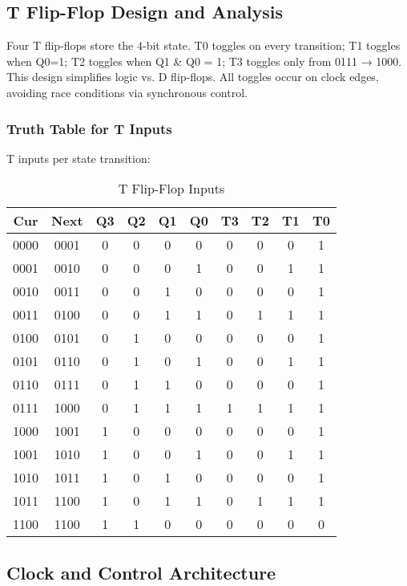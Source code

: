 \documentclass[10pt,a4paper]{article}
\begin{document}
\subsection*{T Flip-Flop Design and Analysis}

Four T flip-flops store the 4-bit state. T0 toggles on every transition; T1 toggles when Q0=1; T2 toggles when Q1 \& Q0 = 1; T3 toggles only from 0111 → 1000. This design simplifies logic vs. D flip-flops. All toggles occur on clock edges, avoiding race conditions via synchronous control.

\subsubsection*{Truth Table for T Inputs}

T inputs per state transition:

\begin{table}[H]
\centering
\begin{tabular}{|c|c|c|c|c|c|c|c|c|c|}
\hline
\textbf{Cur} & \textbf{Next} & Q3 & Q2 & Q1 & Q0 & T3 & T2 & T1 & T0 \\
\hline
0000 & 0001 & 0 & 0 & 0 & 0 & 0 & 0 & 0 & 1 \\
0001 & 0010 & 0 & 0 & 0 & 1 & 0 & 0 & 1 & 1 \\
0010 & 0011 & 0 & 0 & 1 & 0 & 0 & 0 & 0 & 1 \\
0011 & 0100 & 0 & 0 & 1 & 1 & 0 & 1 & 1 & 1 \\
0100 & 0101 & 0 & 1 & 0 & 0 & 0 & 0 & 0 & 1 \\
0101 & 0110 & 0 & 1 & 0 & 1 & 0 & 0 & 1 & 1 \\
0110 & 0111 & 0 & 1 & 1 & 0 & 0 & 0 & 0 & 1 \\
0111 & 1000 & 0 & 1 & 1 & 1 & 1 & 1 & 1 & 1 \\
1000 & 1001 & 1 & 0 & 0 & 0 & 0 & 0 & 0 & 1 \\
1001 & 1010 & 1 & 0 & 0 & 1 & 0 & 0 & 1 & 1 \\
1010 & 1011 & 1 & 0 & 1 & 0 & 0 & 0 & 0 & 1 \\
1011 & 1100 & 1 & 0 & 1 & 1 & 0 & 1 & 1 & 1 \\
1100 & 1100 & 1 & 1 & 0 & 0 & 0 & 0 & 0 & 0 \\
\hline
\end{tabular}
\caption{T Flip-Flop Inputs}
\end{table}

\subsection*{Clock and Control Architecture}
\end{document}
